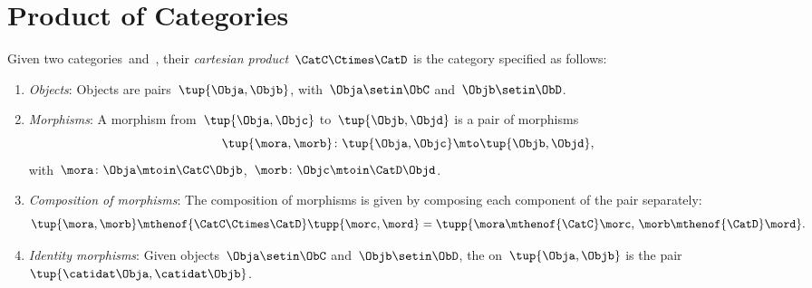
\section{Product of Categories}

\begin{ctdefinition}
    \label{def:cartesian-product-category}
    Given two categories~\CatC and~\CatD, their \emph{cartesian product}~$\CatC \Ctimes \CatD$ is the category specified as follows:
    \begin{enumerate}
        \item \emph{Objects}: Objects are pairs~$\tup{\Obja,\Objb}$, with~$\Obja\setin \ObC$ and~$\Objb\setin \ObD$.
        \item \emph{Morphisms}: A morphism from~$\tup{\Obja, \Objc}$ to~$\tup{\Objb,\Objd}$ is a pair of morphisms
              \begin{equation}
                  \tup{\mora,\morb} \colon \tup{\Obja,\Objc}\mto \tup{\Objb,\Objd},
              \end{equation}
              with~$\mora\colon \Obja \mtoin\CatC \Objb$,~$\morb\colon \Objc\mtoin\CatD \Objd$.
                \item \emph{Composition of morphisms}: The composition of morphisms is given by composing each component of the pair separately:
              \begin{equation}
                  \tup{\mora,\morb}\mthenof{\CatC\Ctimes\CatD} \tupp{\morc,\mord}=\tupp{\mora\mthenof{\CatC}\morc,\, \morb \mthenof{\CatD} \mord}.
              \end{equation}
              \item \emph{Identity morphisms}: Given objects~$\Obja\setin \ObC$ and~$\Objb\setin \ObD$, the  on~$\tup{\Obja,\Objb}$ is the pair $\tup{\catidat\Obja,\catidat\Objb}$.
    \end{enumerate}
\end{ctdefinition}



